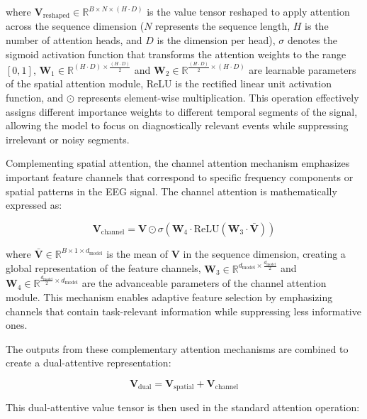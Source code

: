 \documentclass[pdflatex,sn-mathphys-num]{sn-jnl}%
\theoremstyle{thmstyleone}%
\theoremstyle{thmstyletwo}%
\theoremstyle{thmstylethree}%
\begin{document}
where $\mathbf{V}_{\text{reshaped}} \in \mathbb{R}^{B \times N \times (H \cdot D)}$ is the value tensor reshaped to apply attention across the sequence dimension ($N$ represents the sequence length, $H$ is the number of attention heads, and $D$ is the dimension per head), $\sigma$ denotes the sigmoid activation function that transforms the attention weights to the range $[0,1]$, $\mathbf{W}_1 \in \mathbb{R}^{(H \cdot D) \times \frac{(H \cdot D)}{2}}$ and $\mathbf{W}_2 \in \mathbb{R}^{\frac{(H \cdot D)}{2} \times (H \cdot D)}$ are learnable parameters of the spatial attention module, ReLU is the rectified linear unit activation function, and $\odot$ represents element-wise multiplication. This operation effectively assigns different importance weights to different temporal segments of the signal, allowing the model to focus on diagnostically relevant events while suppressing irrelevant or noisy segments.

Complementing spatial attention, the channel attention mechanism emphasizes important feature channels that correspond to specific frequency components or spatial patterns in the EEG signal. The channel attention is mathematically expressed as:

\begin{equation}
\mathbf{V}_{\text{channel}} = \mathbf{V} \odot \sigma\left(\mathbf{W}_4 \cdot \text{ReLU}(\mathbf{W}_3 \cdot \bar{\mathbf{V}})\right)
\end{equation}

where $\bar{\mathbf{V}} \in \mathbb{R}^{B \times 1 \times d_{\text{model}}}$ is the mean of $\mathbf{V}$ in the sequence dimension, creating a global representation of the feature channels, $\mathbf{W}_3 \in \mathbb{R}^{d_{\text{model}} \times \frac{d_{\text{model}}}{2}}$ and $\mathbf{W}_4 \in \mathbb{R}^{\frac{d_{\text{model}}}{2} \times d_{\text{model}}}$ are the advanceable parameters of the channel attention module. This mechanism enables adaptive feature selection by emphasizing channels that contain task-relevant information while suppressing less informative ones.

The outputs from these complementary attention mechanisms are combined to create a dual-attentive representation:

\begin{equation}
\mathbf{V}_{\text{dual}} = \mathbf{V}_{\text{spatial}} + \mathbf{V}_{\text{channel}}
\end{equation}

This dual-attentive value tensor is then used in the standard attention operation:
\end{document}
